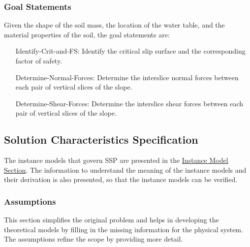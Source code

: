 \documentclass[12pt]{article}
\begin{document}
\subsubsection{Goal Statements}
\label{Sec:GoalStmt}
Given the shape of the soil mass, the location of the water table, and the material properties of the soil, the goal statements are:

\begin{itemize}
\item[Identify-Crit-and-FS:\phantomsection\label{identifyCritAndFS}]{Identify the critical slip surface and the corresponding factor of safety.}
\item[Determine-Normal-Forces:\phantomsection\label{determineNormalF}]{Determine the interslice normal forces between each pair of vertical slices of the slope.}
\item[Determine-Shear-Forces:\phantomsection\label{determineShearF}]{Determine the interslice shear forces between each pair of vertical slices of the slope.}
\end{itemize}
\subsection{Solution Characteristics Specification}
\label{Sec:SolCharSpec}
The instance models that govern SSP are presented in the \hyperref[Sec:IMs]{Instance Model Section}. The information to understand the meaning of the instance models and their derivation is also presented, so that the instance models can be verified.

\subsubsection{Assumptions}
\label{Sec:Assumps}
This section simplifies the original problem and helps in developing the theoretical models by filling in the missing information for the physical system. The assumptions refine the scope by providing more detail.
\end{document}
